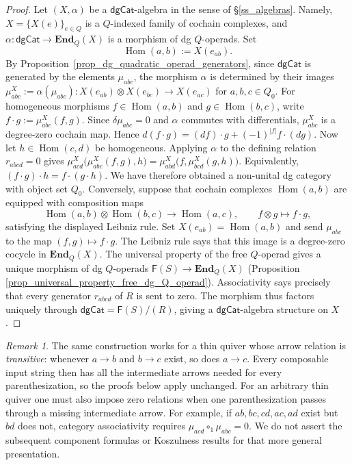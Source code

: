 \documentclass[11pt,letterpaper]{article}
\numberwithin{equation}{section}
\theoremstyle{plain}
\theoremstyle{definition}
\theoremstyle{remark}
\newtheorem{rmk}[thm]{Remark}
\begin{document}
	\begin{proof}
		Let $(X, \alpha)$ be a $\mathsf{dgCat}$-algebra in the sense of \S \ref{ss_algebras}. Namely,
		$X=\{X(e)\}_{e\in Q}$ is a $Q$-indexed family of cochain complexes, and	$ \alpha:	\mathsf{dgCat} \to \mathbf{End}_Q(X)$ is a morphism of dg $Q$-operads. Set
		\[
		\operatorname{Hom}(a,b):=X(e_{ab}).
		\]
		By Proposition~\ref{prop_dg_quadratic_operad_generators}, since $\mathsf{dgCat}$ is generated by the elements $\mu_{abc}$, the morphism $ \alpha$ is determined by their images $\mu_{abc}^X
		:=
		\alpha(\mu_{abc})
		\colon
		X(e_{ab})\otimes X(e_{bc})
		\longrightarrow
		X(e_{ac})$ for $a,b,c\in Q_0$.
		For homogeneous morphisms
		$f\in\operatorname{Hom}(a,b)$ and
		$g\in\operatorname{Hom}(b,c)$, write
		$f\cdot g:=\mu_{abc}^X(f,g)$.
		Since $\delta\mu_{abc}=0$ and $\alpha$ commutes with
		differentials, $\mu_{abc}^X$ is a degree-zero cochain map. Hence
		$d(f\cdot g)
		=
		(df)\cdot g
		+
		(-1)^{|f|}f\cdot(dg)$.
		Now let
		$h\in\operatorname{Hom}(c,d)$ be homogeneous. Applying
		$\alpha$ to the defining relation $r_{abcd}=0$ gives
		$
		\mu_{acd}^X\bigl(\mu_{abc}^X(f,g),h\bigr)
		=
		\mu_{abd}^X\bigl(f,\mu_{bcd}^X(g,h)\bigr)$.
		Equivalently,
		$	(f\cdot g)\cdot h=f\cdot(g\cdot h)$.
		We have therefore obtained a non-unital dg category
		with object set $Q_0$.
		Conversely, suppose that cochain complexes
		$\operatorname{Hom}(a,b)$ are equipped with composition maps
		\[
		\operatorname{Hom}(a,b)
		\otimes
		\operatorname{Hom}(b,c)
		\longrightarrow
		\operatorname{Hom}(a,c),
		\qquad
		f\otimes g\longmapsto f\cdot g,
		\]
		satisfying the displayed Leibniz rule. Set
		$X(e_{ab})=\operatorname{Hom}(a,b)$ and send
		$\mu_{abc}$ to the map $(f,g)\mapsto f\cdot g$. The Leibniz rule says
		that this image is a degree-zero cocycle in $\mathbf{End}_Q(X)$.
		The universal property of the free $Q$-operad gives a
		unique morphism of dg $Q$-operads
		$\mathsf F(S) \to \mathbf{End}_Q(X)$ (Proposition \ref{prop_universal_property_free_dg_Q_operad}).
		Associativity says precisely that every generator $r_{abcd}$ of $R$
		is sent to zero. The morphism thus factors uniquely through
		$\mathsf{dgCat}=\mathsf F(S)/(R)$, giving a
		$\mathsf{dgCat}$-algebra structure on $X$.
	\end{proof}

	\begin{rmk}
		\label{rmk_quiver_not_complete}
The same construction works for a thin quiver whose arrow relation is
\textit{transitive}: whenever $a\to b$ and $b\to c$ exist, so does $a\to c$.
Every composable input string then has all the intermediate arrows
needed for every parenthesization, so the proofs below apply unchanged.
For an arbitrary thin quiver one must also impose zero relations when
one parenthesization passes through a missing intermediate arrow.
For example, if $ab,bc,cd,ac,ad$ exist but $bd$ does not, category
associativity requires $\mu_{acd}\circ_1\mu_{abc}=0$.
We do not assert the subsequent component formulas or Koszulness
results for that more general presentation.
\end{rmk}
\end{document}

